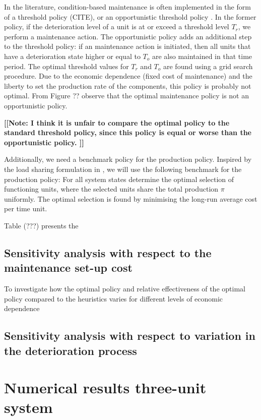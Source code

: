 \documentclass[a4paper,12pt]{article}
\begin{document}
In the literature, condition-based maintenance is often implemented in the form of a threshold policy (CITE), or an opportunistic threshold policy \citep{ZHANG2015176, ZHOU2009361} . In the former policy, if the deterioration level of a unit is at or exceed a threshold level $T_r$, we perform a maintenance action. The opportunistic policy adds an additional step to the threshold policy: if an maintenance action is initiated, then all units that have a deterioration state higher or equal to $T_o$ are also maintained in that time period. The optimal threshold values for $T_r$ and $T_o$ are found using a grid search procedure. Due to the economic dependence (fixed cost of maintenance) and the liberty to set the production rate of the components, this policy is probably not optimal. From Figure ?? observe that the optimal maintenance policy is not an opportunistic policy.

\textbf{[[Note: I think it is unfair to compare the optimal policy to the standard threshold policy, since this policy is equal or worse than the opportunistic policy. ]]}

Additionally, we need a benchmark policy for the production policy. Inspired by the load sharing formulation in \cite{OLDEKEIZER2018319}, we will use the following benchmark for the production policy: For all system states determine the optimal selection of functioning units, where the selected units share the total production $\pi$ uniformly. The optimal selection is found by minimising the long-run average  cost per time unit.


Table (???) presents the 


\subsection{Sensitivity analysis with respect to the maintenance set-up cost}
To investigate how the optimal policy and relative effectiveness of the optimal policy compared to the heuristics varies for different levels of economic dependence

\subsection{Sensitivity analysis with respect to variation in the deterioration process}

\section{Numerical results three-unit system}
\end{document}
